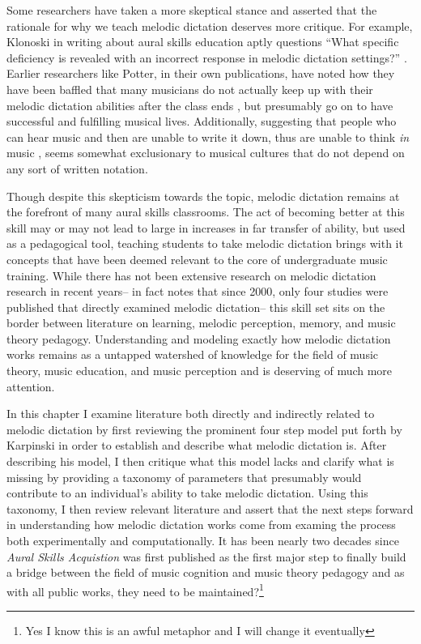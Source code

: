 \documentclass[]{book}
\let\rmarkdownfootnote\footnote%
\def\footnote{\protect\rmarkdownfootnote}
\begin{document}
Some researchers have taken a more skeptical stance and asserted that the rationale for why we teach melodic dictation deserves more critique.
For example, Klonoski in writing about aural skills education aptly questions ``What specific deficiency is revealed with an incorrect response in melodic dictation settings?'' \citep{klonoskiImprovingDictationAuralSkills2006}.
Earlier researchers like Potter, in their own publications, have noted how they have been baffled that many musicians do not actually keep up with their melodic dictation abilities after the class ends \citep{potterIdentifyingSucessfulDictation1990}, but presumably go on to have successful and fulfilling musical lives.
Additionally, suggesting that people who can hear music and then are unable to write it down, thus are unable to think \emph{in} music \citep{karpinskiAuralSkillsAcquisition2000}, seems somewhat exclusionary to musical cultures that do not depend on any sort of written notation.

Though despite this skepticism towards the topic, melodic dictation remains at the forefront of many aural skills classrooms.
The act of becoming better at this skill may or may not lead to large in increases in far transfer of ability, but used as a pedagogical tool, teaching students to take melodic dictation brings with it concepts that have been deemed relevant to the core of undergraduate music training.
While there has not been extensive research on melodic dictation research in recent years-- in fact \citet{paneyEffectDirectingAttention2016} notes that since 2000, only four studies were published that directly examined melodic dictation-- this skill set sits on the border between literature on learning, melodic perception, memory, and music theory pedagogy.
Understanding and modeling exactly how melodic dictation works remains as a untapped watershed of knowledge for the field of music theory, music education, and music perception and is deserving of much more attention.

In this chapter I examine literature both directly and indirectly related to melodic dictation by first reviewing the prominent four step model put forth by Karpinski in order to establish and describe what melodic dictation is.
After describing his model, I then critique what this model lacks and clarify what is missing by providing a taxonomy of parameters that presumably would contribute to an individual's ability to take melodic dictation.
Using this taxonomy, I then review relevant literature and assert that the next steps forward in understanding how melodic dictation works come from examing the process both experimentally and computationally.
It has been nearly two decades since \emph{Aural Skills Acquistion} was first published as the first major step to finally build a bridge between the field of music cognition and music theory pedagogy \citep{davidbutlerWhyGulfMusic1997a, karpinskiAuralSkillsAcquisition2000, klonoskiPerceptualLearningHierarchy2000} and as with all public works, they need to be maintained?\footnote{Yes I know this is an awful metaphor and I will change it eventually}
\end{document}
